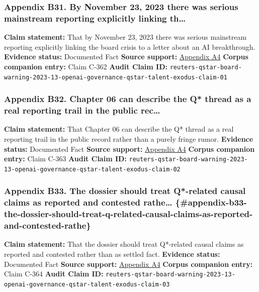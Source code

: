 \documentclass[
  american,
  11pt,
  letterpaper,
]{article}
\begin{document}
\subsubsection{Appendix B31. By November 23, 2023 there was serious
mainstream reporting explicitly linking
th\ldots{}}\label{appendix-b31-by-november-23-2023-there-was-serious-mainstream-reporting-explicitly-linking-th}

\textbf{Claim statement:} That by November 23, 2023 there was serious
mainstream reporting explicitly linking the board crisis to a letter
about an AI breakthrough. \textbf{Evidence status:} Documented Fact
\textbf{Source support:}
\hyperref[appendix-a4-openai-researchers-warned-board-of-ai-breakthrough-ahead-of-ceo-ouster-sources-say]{Appendix
A4} \textbf{Corpus companion entry:} Claim C-362 \textbf{Audit Claim
ID:}
\texttt{reuters-qstar-board-warning-2023-13-openai-governance-qstar-talent-exodus-claim-01}

\subsubsection{Appendix B32. Chapter 06 can describe the Q* thread as a
real reporting trail in the public
rec\ldots{}}\label{appendix-b32-chapter-06-can-describe-the-q-thread-as-a-real-reporting-trail-in-the-public-rec}

\textbf{Claim statement:} That Chapter 06 can describe the Q* thread as
a real reporting trail in the public record rather than a purely fringe
rumor. \textbf{Evidence status:} Documented Fact \textbf{Source
support:}
\hyperref[appendix-a4-openai-researchers-warned-board-of-ai-breakthrough-ahead-of-ceo-ouster-sources-say]{Appendix
A4} \textbf{Corpus companion entry:} Claim C-363 \textbf{Audit Claim
ID:}
\texttt{reuters-qstar-board-warning-2023-13-openai-governance-qstar-talent-exodus-claim-02}

\subsubsection{Appendix B33. The dossier should treat Q*-related causal
claims as reported and contested rathe\ldots{}
\{\#appendix-b33-the-dossier-should-treat-q-related-causal-claims-as-reported-and-contested-rathe\}}\label{appendix-b33.-the-dossier-should-treat-q-related-causal-claims-as-reported-and-contested-rathe-appendix-b33-the-dossier-should-treat-q-related-causal-claims-as-reported-and-contested-rathe}

\textbf{Claim statement:} That the dossier should treat Q*-related
causal claims as reported and contested rather than as settled fact.
\textbf{Evidence status:} Documented Fact \textbf{Source support:}
\hyperref[appendix-a4-openai-researchers-warned-board-of-ai-breakthrough-ahead-of-ceo-ouster-sources-say]{Appendix
A4} \textbf{Corpus companion entry:} Claim C-364 \textbf{Audit Claim
ID:}
\texttt{reuters-qstar-board-warning-2023-13-openai-governance-qstar-talent-exodus-claim-03}
\end{document}
